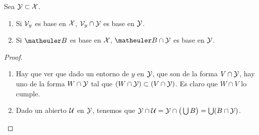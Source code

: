\begin{lem}
	Sea $\mathcal{Y} \subset \mathcal{X}$.
 	\begin{enumerate}
 		\item Si $\mathcal{V}_y$ es base en $\mathcal{X}$, $\mathcal{V}_y \cap \mathcal{Y}$ es base en $\mathcal{Y}$.
 		\item Si $\B$ es base en $\mathcal{X}$, $\B \cap \mc{Y}$ es base en $\mathcal{Y}$.
 	\end{enumerate}
\end{lem}
\begin{proof}
	\begin{enumerate}
		\item Hay que ver que dado un entorno de $y$ en $\mathcal{Y}$, que son de la forma $V \cap \mathcal{Y}$, hay uno de la forma $W \cap \mathcal{Y}$ tal que $(W \cap \mathcal{Y}) \subset (V \cap \mathcal{Y})$. Es claro que $W \cap V$ lo cumple.
		\item Dado un abierto $\mathcal{U}$ en $\mathcal{Y}$, tenemos que $\mathcal{Y} \cap \mathcal{U} = \mathcal{Y} \cap \big( \bigcup B \big) = \bigcup (B \cap \mathcal{Y})$.
	\end{enumerate}
\end{proof}
